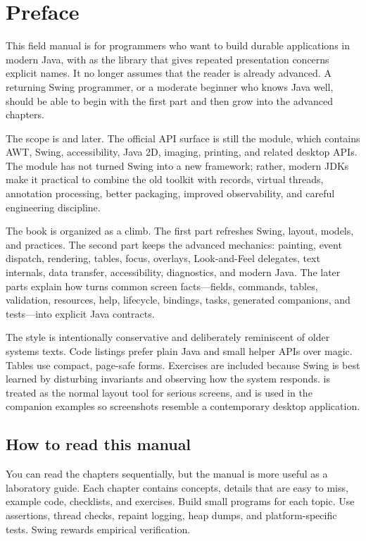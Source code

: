 \chapter*{Preface}

This field manual is for programmers who want to build durable \swing{} applications in modern Java, with \corusco{} as the library that gives repeated presentation concerns explicit names. It no longer assumes that the reader is already advanced. A returning Swing programmer, or a moderate beginner who knows Java well, should be able to begin with the first part and then grow into the advanced chapters.

The scope is \jdk{} and later. The official API surface is still the  module, which contains AWT, Swing, accessibility, Java 2D, imaging, printing, and related desktop APIs. The module has not turned Swing into a new framework; rather, modern JDKs make it practical to combine the old toolkit with records, virtual threads, annotation processing, better packaging, improved observability, and careful engineering discipline.

The book is organized as a climb. The first part refreshes Swing, layout, models, and practices. The second part keeps the advanced mechanics: painting, event dispatch, rendering, tables, focus, overlays, Look-and-Feel delegates, text internals, data transfer, accessibility, diagnostics, and modern Java. The later parts explain how \corusco{} turns common screen facts---fields, commands, tables, validation, resources, help, lifecycle, bindings, tasks, generated companions, and tests---into explicit Java contracts.

The style is intentionally conservative and deliberately reminiscent of older systems texts. Code listings prefer plain Java and small helper APIs over magic. Tables use compact, page-safe forms. Exercises are included because Swing is best learned by disturbing invariants and observing how the system responds. \miglayout{} is treated as the normal layout tool for serious screens, and \flatlaf{} is used in the companion examples so screenshots resemble a contemporary desktop application.

\section*{How to read this manual}

You can read the chapters sequentially, but the manual is more useful as a laboratory guide. Each chapter contains concepts, details that are easy to miss, example code, checklists, and exercises. Build small programs for each topic. Use assertions, thread checks, repaint logging, heap dumps, and platform-specific tests. Swing rewards empirical verification.

